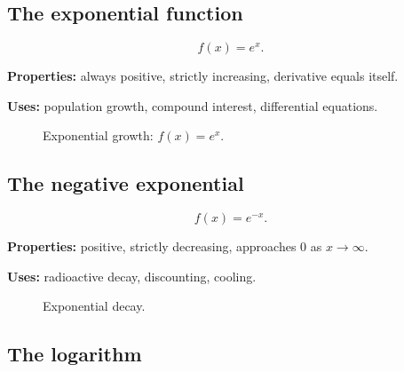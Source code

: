 \subsection{The exponential function}

\[
f(x)=e^x.
\]

\textbf{Properties:} always positive, strictly increasing, derivative equals itself.

\textbf{Uses:} population growth, compound interest, differential equations.

\begin{figure}[h]
\centering
{}
\caption{Exponential growth: $f(x)=e^x$.}
\end{figure}

\subsection{The negative exponential}

\[
f(x)=e^{-x}.
\]

\textbf{Properties:} positive, strictly decreasing, approaches $0$ as $x\to\infty$.

\textbf{Uses:} radioactive decay, discounting, cooling.

\begin{figure}[h]
\centering
{}
\caption{Exponential decay.}
\end{figure}

\subsection{The logarithm}

